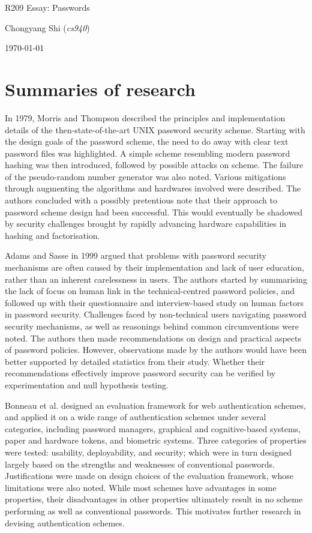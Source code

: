 \documentclass[11pt]{article}
\begin{document}
\centerline{\Large R209 Essay:  Passwords}
\vspace{2em}
\centerline{\large Chongyang Shi (\emph{cs940})}
\vspace{1em}
\centerline{\large \today}
\vspace{1em}

\section{Summaries of research}

In 1979, Morris and Thompson \cite{morris1979password} described the principles and implementation details of the then-state-of-the-art UNIX password security scheme. Starting with the design goals of the password scheme, the need to do away with clear text password files was highlighted. A simple scheme resembling modern password hashing was then introduced, followed by possible attacks on scheme. The failure of the pseudo-random number generator was also noted. Various mitigations through augmenting the algorithms and hardwares involved were described. The authors concluded with a possibly pretentious note that their approach to password scheme design had been successful. This would eventually be shadowed by security challenges brought by rapidly advancing hardware capabilities in hashing and factorisation. 

Adams and Sasse \cite{adams1999users} in 1999 argued that problems with password security mechanisms are often caused by their implementation and lack of user education, rather than an inherent carelessness in users. The authors started by summarising the lack of focus on human link in the technical-centred password policies, and followed up with their questionnaire and interview-based study on human factors in password security. Challenges faced by non-technical users navigating password security mechanisms, as well as reasonings behind common circumventions were noted. The authors then made recommendations on design and practical aspects of password policies. However, observations made by the authors would have been better supported by detailed statistics from their study. Whether their recommendations effectively improve password security can be verified by experimentation and null hypothesis testing. 

Bonneau et al. \cite{bonneau2012quest} designed an evaluation framework for web authentication schemes, and applied it on a wide range of authentication schemes under several categories, including password managers, graphical and cognitive-based systems, paper and hardware tokens, and biometric systems. Three categories of properties were tested: usability, deployability, and security; which were in turn designed largely based on the strengths and weaknesses of conventional passwords. Justifications were made on design choices of the evaluation framework, whose limitations were also noted. While most schemes have advantages in some properties, their disadvantages in other properties ultimately result in no scheme performing as well as conventional passwords. This motivates further research in devising authentication schemes. 
\end{document}
